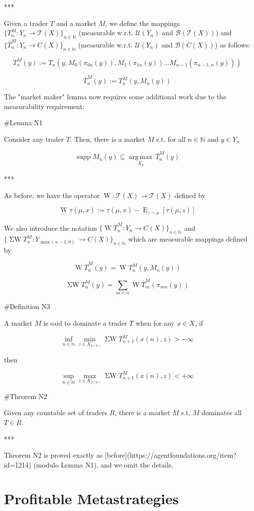 \documentclass[a4paper]{article}
\DeclareMathOperator{\Supp}{supp}
\DeclareMathOperator{\E}{E}
\newcommand{\Argmax}[1]{\underset{#1}{\operatorname{arg\,max}}\,}
\newcommand{\Nats}{\mathbb{N}}
\newcommand{\T}{\mathcal{T}}
\newcommand{\B}{\mathcal{B}}
\newcommand{\UM}{\mathcal{U}}
\newcommand{\W}{\operatorname{W}}
\newcommand{\SW}{\operatorname{\Sigma W}}
\begin{document}
***

Given a trader ${T}$ and a market ${M}$, we define the mappings ${\{T^M_n: Y_n \rightarrow \T(X)\}_{n \in \Nats}}$ (measurable w.r.t. ${\UM(Y_n)}$ and ${\B(\T(X))}$) and ${\{\bar{T}^M_n: Y_n \rightarrow C(X)\}_{n \in \Nats}}$ (measurable w.r.t. ${\UM(Y_n)}$ and ${\B(C(X))}$) as follows:

$$T^M_n(y):= T_n(y, M_0(\pi_{0n}(y)),M_1(\pi_{1n}(y)) \ldots M_{n-1}(\pi_{n-1,n}(y)))$$

$$\bar{T}^M_n(y):= T^M_n(y,M_n(y))$$

The "market maker" lemma now requires some additional work due to the measurability requirement:

\#Lemma N1

Consider any trader ${T}$. Then, there is a market ${M}$ s.t. for all ${n \in \Nats}$ and ${y \in Y_n}$

$$\Supp M_n(y) \subseteq \Argmax{X_y} \bar{T}^M_n(y)$$

***

As before, we have the operator ${\W: \T(X) \rightarrow \T(X)}$ defined by 

$$\W \tau(\mu,x):= \tau(\mu,x) - \E_{z \sim \mu}[\tau(\mu,z)]$$

We also introduce the notation ${\{\W \bar{T}^M_n: Y_n \rightarrow C(X)\}_{n \in \Nats}}$ and ${\{\SW T^M_n: Y_{\max(n-1,0)}\ \rightarrow C(X)\}_{n \in \Nats}}$ which are measurable mappings defined by

$$\W \bar{T}^M_n(y) = \W T^M_n(y, M_n(y))$$

$$\SW T^M_n(y) = \sum_{m < n} \W \bar{T}^M_m(\pi_{mn}(y))$$

\#Definition N3

A market ${M}$ is said to dominate a trader ${T}$ when for any ${x \in X}$, if

$$\inf_{n \in \Nats} \min_{z \in X_{x(n)}} \SW T^M_{n+1}(x(n),z) > -\infty$$

then

$$\sup_{n \in \Nats} \max_{z \in X_{x(n)}} \SW T^M_{n+1}(x(n),z) < +\infty$$

\#Theorem N2

Given any countable set of traders $R$, there is a market ${M}$ s.t. ${M}$ dominates all ${T \in R}$.

***

Theorem N2 is proved exactly as [before](https://agentfoundations.org/item?id=1214) (modulo Lemma N1), and we omit the details.

\section{Profitable Metastrategies}
\end{document}
